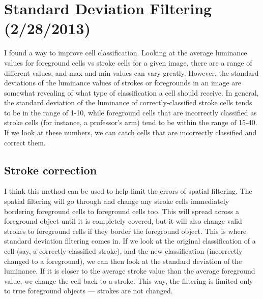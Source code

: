 \documentclass[]{article}
\begin{document}
	\section{Standard Deviation Filtering (2/28/2013)}	
		I found a way to improve cell classification.  Looking at the average luminance values for foreground cells vs stroke cells for a given image, there are a range of different values, and max and min values can vary greatly.  However, the standard deviations of the luminance values of strokes or foregrounds in an image are somewhat revealing of what type of classification a cell should receive.  In general, the standard deviation of the luminance of correctly-classified stroke cells tends to be in the range of 1-10, while foreground cells that are incorrectly classified as stroke cells (for instance, a professor's arm) tend to be within the range of 15-40.  If we look at these numbers, we can catch cells that are incorrectly classified and correct them.  
	\subsection*{Stroke correction}
		I think this method can be used to help limit the errors of spatial filtering.  The spatial filtering will go through and change any stroke cells immediately bordering foreground cells to foreground cells too.  This will spread across a foreground object until it is completely covered, but it will also change valid strokes to foreground cells if they border the foreground object. This is where standard deviation filtering comes in.  If we look at the original classification of a cell (say, a correctly-classified stroke), and the new classification (incorrectly changed to a foreground), we can then look at the standard deviation of the luminance.  If it is closer to the average stroke value than the average foreground value, we change the cell back to a stroke.  This way, the filtering is limited only to true foreground objects --- strokes are not changed.
	
\end{document}
